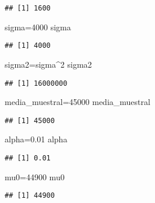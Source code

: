 \documentclass[
]{article}
\newenvironment{Shaded}{\begin{snugshade}}{\end{snugshade}}
\newcommand{\DecValTok}[1]{\textcolor[rgb]{0.00,0.00,0.81}{#1}}
\newcommand{\FloatTok}[1]{\textcolor[rgb]{0.00,0.00,0.81}{#1}}
\newcommand{\NormalTok}[1]{#1}
\newcommand{\OperatorTok}[1]{\textcolor[rgb]{0.81,0.36,0.00}{\textbf{#1}}}
\begin{document}
\begin{verbatim}
## [1] 1600
\end{verbatim}

\begin{Shaded}
\begin{Highlighting}[]
\NormalTok{sigma=}\DecValTok{4000}
\NormalTok{sigma}
\end{Highlighting}
\end{Shaded}

\begin{verbatim}
## [1] 4000
\end{verbatim}

\begin{Shaded}
\begin{Highlighting}[]
\NormalTok{sigma2=sigma}\OperatorTok{^}\DecValTok{2}
\NormalTok{sigma2}
\end{Highlighting}
\end{Shaded}

\begin{verbatim}
## [1] 16000000
\end{verbatim}

\begin{Shaded}
\begin{Highlighting}[]
\NormalTok{media_muestral=}\DecValTok{45000}
\NormalTok{media_muestral}
\end{Highlighting}
\end{Shaded}

\begin{verbatim}
## [1] 45000
\end{verbatim}

\begin{Shaded}
\begin{Highlighting}[]
\NormalTok{alpha=}\FloatTok{0.01}
\NormalTok{alpha}
\end{Highlighting}
\end{Shaded}

\begin{verbatim}
## [1] 0.01
\end{verbatim}

\begin{Shaded}
\begin{Highlighting}[]
\NormalTok{mu0=}\DecValTok{44900}
\NormalTok{mu0}
\end{Highlighting}
\end{Shaded}

\begin{verbatim}
## [1] 44900
\end{verbatim}
\end{document}
